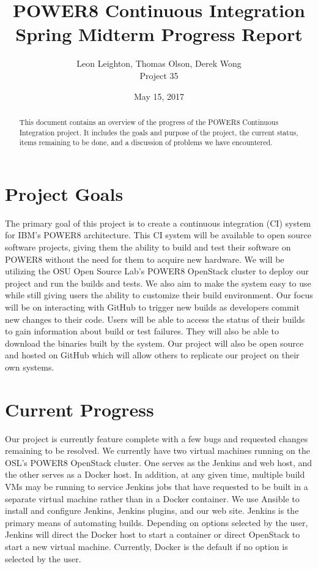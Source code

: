 \documentclass[10pt,onecolumn,journal,draftclsnofoot]{IEEEtran}
\begin{document}
\begin{titlepage}
  \title{POWER8 Continuous Integration\\ Spring Midterm Progress Report}
  \author{Leon Leighton, Thomas Olson, Derek Wong\\Project 35}
  \date{May 15, 2017}
  \maketitle
  \vspace{4cm}
  \begin{abstract}
  \noindent This document contains an overview of the progress of the POWER8 Continuous Integration project.
    It includes the goals and purpose of the project, the current status, items remaining to be done, 
    and a discussion of problems we have encountered. 
 \end{abstract}
\end{titlepage}

\tableofcontents
\clearpage

\section{Project Goals}
The primary goal of this project is to create a continuous integration (CI) system for IBM's POWER8 architecture.
This CI system will be available to open source software projects, giving them the ability to build and test their software on POWER8 without the need for them to acquire new hardware.
We will be utilizing the OSU Open Source Lab's POWER8 OpenStack cluster to deploy our project and run the builds and tests.
We also aim to make the system easy to use while still giving users the ability to customize their build environment.
Our focus will be on interacting with GitHub to trigger new builds as developers commit new changes to their code.
Users will be able to access the status of their builds to gain information about build or test failures.
They will also be able to download the binaries built by the system.
Our project will also be open source and hosted on GitHub which will allow others to replicate our project on their own systems.

\section{Current Progress}
Our project is currently feature complete with a few bugs and requested changes remaining to be resolved.
We currently have two virtual machines running on the OSL's POWER8 OpenStack cluster.
One serves as the Jenkins and web host, and the other serves as a Docker host. 
In addition, at any given time, multiple build VMs may be running to service Jenkins jobs that have requested to be built in a separate virtual machine rather than in a Docker container.
We use Ansible to install and configure Jenkins, Jenkins plugins, and our web site. 
Jenkins is the primary means of automating builds.
Depending on options selected by the user, Jenkins will direct the Docker host to start a container or direct OpenStack to start
a new virtual machine. 
Currently, Docker is the default if no option is selected by the user.
\end{document}
